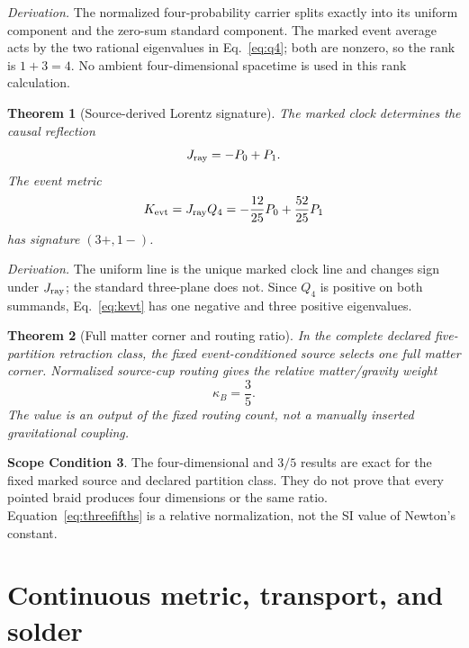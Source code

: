 \documentclass[11pt]{article}
\newtheorem{theorem}{Theorem}[section]
\theoremstyle{definition}
\newtheorem{scope}[theorem]{Scope Condition}
\theoremstyle{remark}
\begin{document}
\textit{Derivation.} The normalized four-probability carrier splits exactly into its uniform component and the zero-sum standard component. The marked event average acts by the two rational eigenvalues in Eq.~\eqref{eq:q4}; both are nonzero, so the rank is $1+3=4$. No ambient four-dimensional spacetime is used in this rank calculation.

\begin{theorem}[Source-derived Lorentz signature]
The marked clock determines the causal reflection
\begin{equation}
J_{\rm ray}=-P_0+P_1.
\end{equation}
The event metric
\begin{equation}
K_{\rm evt}=J_{\rm ray}Q_4
=-\frac{12}{25}P_0+\frac{52}{25}P_1
\label{eq:kevt}
\end{equation}
has signature $(3+,1-)$.
\end{theorem}

\textit{Derivation.} The uniform line is the unique marked clock line and changes sign under $J_{\rm ray}$; the standard three-plane does not. Since $Q_4$ is positive on both summands, Eq.~\eqref{eq:kevt} has one negative and three positive eigenvalues.

\begin{theorem}[Full matter corner and routing ratio]
In the complete declared five-partition retraction class, the fixed event-conditioned source selects one full matter corner. Normalized source-cup routing gives the relative matter/gravity weight
\begin{equation}
\kappa_B=\frac35.
\label{eq:threefifths}
\end{equation}
The value is an output of the fixed routing count, not a manually inserted gravitational coupling.
\end{theorem}

\begin{scope}
The four-dimensional and $3/5$ results are exact for the fixed marked source and declared partition class. They do not prove that every pointed braid produces four dimensions or the same ratio. Equation~\eqref{eq:threefifths} is a relative normalization, not the SI value of Newton's constant.
\end{scope}

\section{Continuous metric, transport, and solder}
\end{document}
